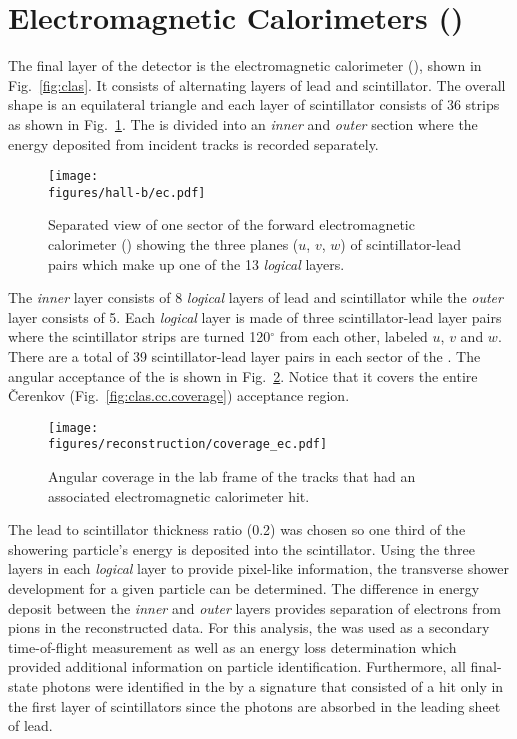 \section{\label{sec:clas.ec}Electromagnetic Calorimeters ()}

The final layer of the  detector is the electromagnetic calorimeter ()\cite{clas.ec}, shown in Fig.~\ref{fig:clas}. It consists of alternating layers of lead and scintillator. The overall shape is an equilateral triangle and each layer of scintillator consists of 36 strips as shown in Fig.~\ref{fig:clas.ec}. The  is divided into an \emph{inner} and \emph{outer} section where the energy deposited from incident tracks is recorded separately.

\begin{figure}\begin{center}
\texttt{[image: \\figures/hall-b/ec.pdf]}
\caption[Electromagnetic Calorimeter Layers]{\label{fig:clas.ec}{}Separated view of one sector of the forward electromagnetic calorimeter () showing the three planes ($u$, $v$, $w$) of scintillator-lead pairs which make up one of the 13 \emph{logical} layers.}
\end{center}\end{figure}

The \emph{inner} layer consists of 8 \emph{logical} layers of lead and scintillator while the \emph{outer} layer consists of 5. Each \emph{logical} layer is made of three scintillator-lead layer pairs where the scintillator strips are turned 120$^\circ$ from each other, labeled $u$, $v$ and $w$. There are a total of 39 scintillator-lead layer pairs in each sector of the . The angular acceptance of the  is shown in Fig.~\ref{fig:clas.ec.coverage}. Notice that it covers the entire \v{C}erenkov (Fig.~\ref{fig:clas.cc.coverage}) acceptance region.

\begin{figure}\begin{center}
\texttt{[image: \\figures/reconstruction/coverage\_ec.pdf]}
\caption[Electromagnetic Calorimeter Angular Coverage]{\label{fig:clas.ec.coverage}{}Angular coverage in the lab frame of the tracks that had an associated electromagnetic calorimeter hit.}
\end{center}\end{figure}

The lead to scintillator thickness ratio (0.2) was chosen so one third of the showering particle's energy is deposited into the scintillator. Using the three layers in each \emph{logical} layer to provide pixel-like information, the transverse shower development for a given particle can be determined. The difference in energy deposit between the \emph{inner} and \emph{outer} layers provides separation of electrons from pions in the reconstructed data. For this analysis, the  was used as a secondary time-of-flight measurement as well as an energy loss determination which provided additional information on particle identification. Furthermore, all final-state photons were identified in the  by a signature that consisted of a hit only in the first layer of scintillators since the photons are absorbed in the leading sheet of lead.
